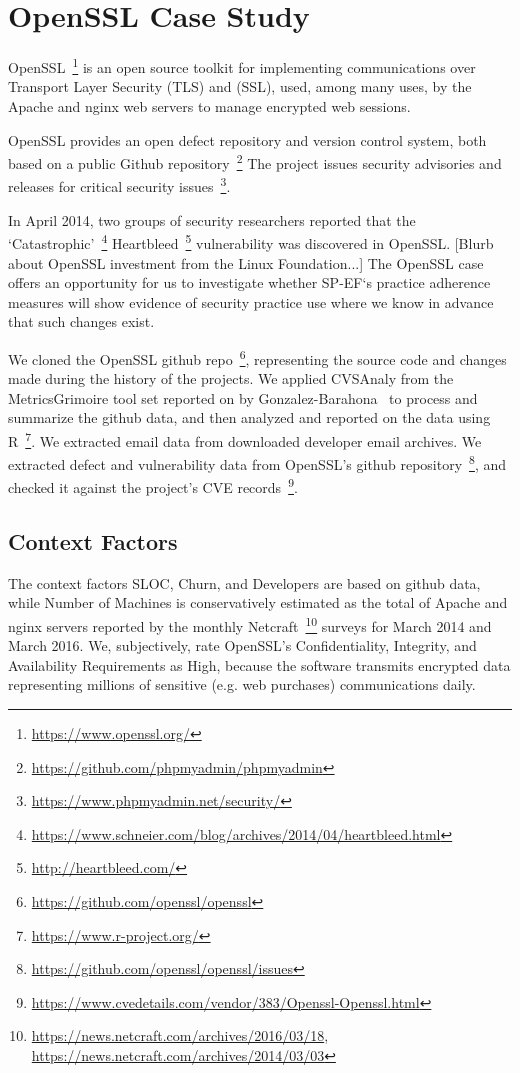 \section{OpenSSL Case Study}
\label{sec:case_openssl}

OpenSSL~\footnote{\url{https://www.openssl.org/}} is an open source toolkit for implementing communications over Transport Layer Security (TLS) and (SSL), used, among many uses, by the Apache and nginx web servers to manage encrypted web sessions.   

OpenSSL provides an open defect repository and version control system, both based on a public Github repository~\footnote{\url{https://github.com/phpmyadmin/phpmyadmin}} The project issues security advisories and releases for critical security issues~\footnote{\url{https://www.phpmyadmin.net/security/}}. 

In April 2014, two groups of security researchers reported that the `Catastrophic'~\footnote{\url{https://www.schneier.com/blog/archives/2014/04/heartbleed.html}} Heartbleed~\footnote{\url{http://heartbleed.com/}} vulnerability was discovered in OpenSSL. [Blurb about OpenSSL investment from the Linux Foundation...] The OpenSSL case offers an opportunity for us to investigate whether SP-EF`s practice adherence measures will show evidence of security practice use where we know in advance that such changes exist.

We cloned the OpenSSL github repo~\footnote{\url{https://github.com/openssl/openssl}}, representing the source code and changes made during the history of the projects. We applied CVSAnaly from the MetricsGrimoire tool set reported on by Gonzalez-Barahona~\cite{barahona2015metrics} to process and summarize the github data, and then analyzed and reported on the data using R~\footnote{\url{https://www.r-project.org/}}. We extracted email data from downloaded developer email archives. We extracted defect and vulnerability data from OpenSSL’s github repository~\footnote{\url{https://github.com/openssl/openssl/issues}}, and checked it against the project’s CVE records~\footnote{\url{https://www.cvedetails.com/vendor/383/Openssl-Openssl.html}}.

\subsection{Context Factors}
The context factors SLOC, Churn, and Developers are based on github data, while Number of Machines is conservatively estimated as the total of Apache and nginx servers reported by the monthly Netcraft~\footnote{\url{https://news.netcraft.com/archives/2016/03/18}, \url{https://news.netcraft.com/archives/2014/03/03}} surveys for March 2014 and March 2016. We, subjectively, rate OpenSSL’s Confidentiality, Integrity, and Availability Requirements as High, because the software transmits encrypted data representing millions of sensitive (e.g. web purchases) communications daily.

